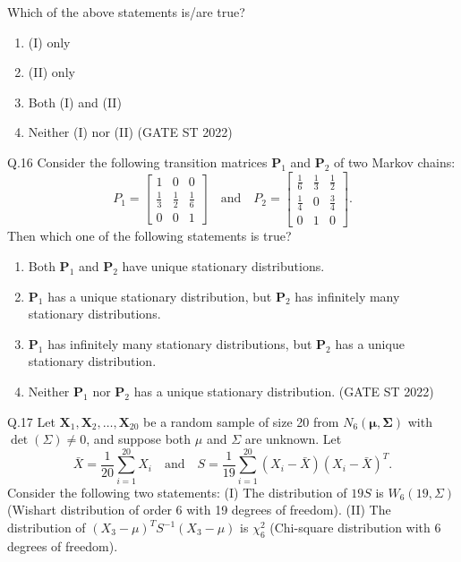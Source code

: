 \documentclass[journal,12pt,onecolumn]{IEEEtran}
\theoremstyle{remark}
\begin{document}
Which of the above statements is/are true?
\begin{enumerate}[label=\alph*.] 
	\item (I) only
	\item (II) only
	\item Both (I) and (II)
	\item Neither (I) nor (II)
	\hfill (GATE ST 2022)
\end{enumerate}
	\vspace{2em}
Q.16 Consider the following transition matrices $\textbf{P}_1$ and $\textbf{P}_2$ of two Markov chains:
\[
P_1 = 
\begin{bmatrix}
	1 & 0 & 0 \\
	\frac{1}{3} & \frac{1}{2} & \frac{1}{6} \\
	0 & 0 & 1
\end{bmatrix}
\quad \text{and} \quad
P_2 = 
\begin{bmatrix}
	\frac{1}{6} & \frac{1}{3} & \frac{1}{2} \\
	\frac{1}{4} & 0 & \frac{3}{4} \\
	0 & 1 & 0
\end{bmatrix}.
\]
Then which one of the following statements is true?
\begin{enumerate}[label=\alph*.] 
	\item Both $\textbf{P}_1$ and $\textbf{P}_2$ have unique stationary distributions.
	\item $\textbf{P}_1$ has a unique stationary distribution, but $\textbf{P}_2$ has infinitely many stationary distributions.
	\item $\textbf{P}_1$ has infinitely many stationary distributions, but $\textbf{P}_2$ has a unique stationary distribution.
	\item Neither $\textbf{P}_1$ nor $\textbf{P}_2$ has a unique stationary distribution.
	\hfill (GATE ST 2022)
\end{enumerate}
	\vspace{2em}
Q.17 Let $\textbf{X}_1, \textbf{X}_2, \dots, \textbf{X}_{20}$ be a random sample of size 20 from $N_6(\mathbf{\mu,\Sigma})$ with $\det(\Sigma) \neq 0$, and suppose both $\mu$ and $\Sigma$ are unknown. Let 
$$
\bar{X} = \frac{1}{20}\sum_{i=1}^{20} X_i 
\quad \text{and} \quad
S = \frac{1}{19} \sum_{i=1}^{20} (X_i - \bar{X})(X_i - \bar{X})^T.
$$ 
Consider the following two statements:
(I) The distribution of $19S$ is $W_6(19,\Sigma)$ (Wishart distribution of order 6 with 19 degrees of freedom).
(II) The distribution of $(X_3 - \mu)^T S^{-1}(X_3 - \mu)$ is $\chi^2_6$ (Chi-square distribution with 6 degrees of freedom).
\end{document}
